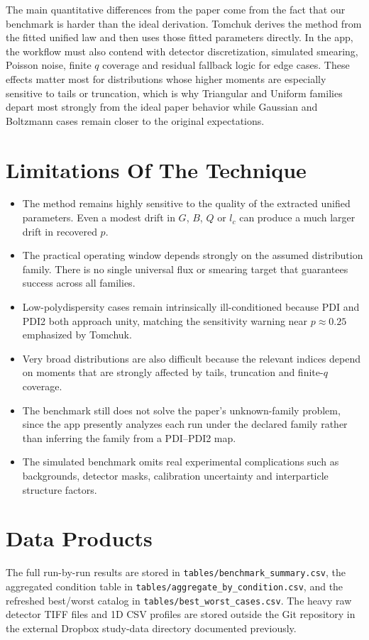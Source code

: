 \documentclass[11pt]{article}
\begin{document}
The main quantitative differences from the paper come from the fact that our benchmark is harder than the ideal derivation.
Tomchuk derives the method from the fitted unified law and then uses those fitted parameters directly.
In the app, the workflow must also contend with detector discretization, simulated smearing, Poisson noise, finite $q$ coverage and residual fallback logic for edge cases.
These effects matter most for distributions whose higher moments are especially sensitive to tails or truncation, which is why Triangular and Uniform families depart most strongly from the ideal paper behavior while Gaussian and Boltzmann cases remain closer to the original expectations.

\section{Limitations Of The Technique}
\begin{itemize}
\item The method remains highly sensitive to the quality of the extracted unified parameters. Even a modest drift in $G$, $B$, $Q$ or $l_c$ can produce a much larger drift in recovered $p$.
\item The practical operating window depends strongly on the assumed distribution family. There is no single universal flux or smearing target that guarantees success across all families.
\item Low-polydispersity cases remain intrinsically ill-conditioned because PDI and PDI2 both approach unity, matching the sensitivity warning near $p \approx 0.25$ emphasized by Tomchuk.
\item Very broad distributions are also difficult because the relevant indices depend on moments that are strongly affected by tails, truncation and finite-$q$ coverage.
\item The benchmark still does not solve the paper's unknown-family problem, since the app presently analyzes each run under the declared family rather than inferring the family from a PDI--PDI2 map.
\item The simulated benchmark omits real experimental complications such as backgrounds, detector masks, calibration uncertainty and interparticle structure factors.
\end{itemize}

\section{Data Products}
The full run-by-run results are stored in \texttt{tables/benchmark\_summary.csv}, the aggregated condition table in \texttt{tables/aggregate\_by\_condition.csv}, and the refreshed best/worst catalog in \texttt{tables/best\_worst\_cases.csv}.
The heavy raw detector TIFF files and 1D CSV profiles are stored outside the Git repository in the external Dropbox study-data directory documented previously.
\end{document}
